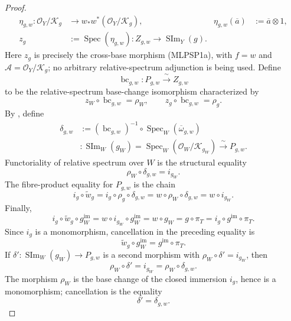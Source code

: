 \begin{proof}
  \[
  \begin{aligned}
    \eta_{g,w}\colon\mathcal O_Y/\mathcal K_g
      &\longrightarrow w_*w^*(\mathcal O_Y/\mathcal K_g),&
    \eta_{g,w}(\overline a)&:=\overline a\otimes1,\\
    z_g&:=\operatorname{Spec}(\eta_{g,w})\colon
      Z_{g,w}\longrightarrow\operatorname{SIm}_Y(g).
  \end{aligned}
  \]
  Here $z_g$ is precisely the cross-base morphism (MLPSP1a), with
  $f=w$ and $\mathcal A=\mathcal O_Y/\mathcal K_g$; no arbitrary
  relative-spectrum adjunction is being used.
  Define
  \[
    \operatorname{bc}_{g,w}\colon P_{g,w}
      \xrightarrow{\ \sim\ }
      Z_{g,w}
  \]
  to be the relative-spectrum base-change isomorphism characterized by
  \[
    z_W\circ\operatorname{bc}_{g,w}=\rho_W,
    \qquad
    z_g\circ\operatorname{bc}_{g,w}=\rho_g.
  \]
  By
  , define
  \[
  \begin{aligned}
    \delta_{g,w}
      &:=(\operatorname{bc}_{g,w})^{-1}\circ
        \operatorname{Spec}_W(\overline\omega_{g,w})\\
      &\colon
        \operatorname{SIm}_W(g_W)
        =\operatorname{Spec}_W(\mathcal O_W/\mathcal K_{g_W})
        \xrightarrow{\ \sim\ }P_{g,w}.
  \end{aligned}
  \]
  Functoriality of relative spectrum over $W$ is the structural equality
  \[
    \rho_W\circ\delta_{g,w}=i_{g_W}.
  \]
  The fibre-product equality for $P_{g,w}$ is the chain
  \[
    i_g\circ\widetilde w_g
      =i_g\circ\rho_g\circ\delta_{g,w}
      =w\circ\rho_W\circ\delta_{g,w}
      =w\circ i_{g_W}.
  \]
  Finally,
  \[
    i_g\circ\widetilde w_g\circ g_W^{\mathrm{im}}
      =w\circ i_{g_W}\circ g_W^{\mathrm{im}}
      =w\circ g_W
      =g\circ\pi_T
      =i_g\circ g^{\mathrm{im}}\circ\pi_T.
  \]
  Since $i_g$ is a monomorphism, cancellation in the preceding equality is
  \[
    \widetilde w_g\circ g_W^{\mathrm{im}}
      =g^{\mathrm{im}}\circ\pi_T.
  \]
  If $\delta'\colon\operatorname{SIm}_W(g_W)\to P_{g,w}$ is a second
  morphism with $\rho_W\circ\delta'=i_{g_W}$, then
  \[
    \rho_W\circ\delta'
      =i_{g_W}
      =\rho_W\circ\delta_{g,w}.
  \]
  The morphism $\rho_W$ is the base change of the closed immersion $i_g$,
  hence is a monomorphism; cancellation is the equality
  \[
    \delta'=\delta_{g,w}.
  \]
\end{proof}

